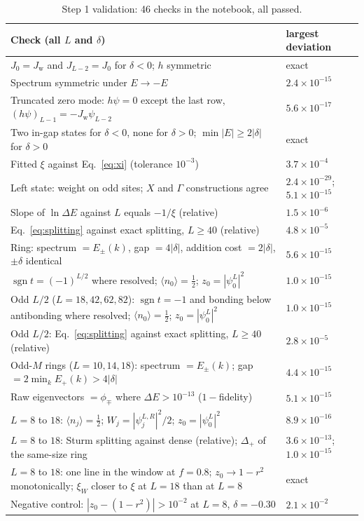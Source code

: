 \documentclass[11pt,a4paper]{article}
\newcommand{\Jw}{J_{\mathrm{w}}}
\begin{document}
\begin{table}[h]
  \centering
  \footnotesize
  \begin{tabular}{p{11.2cm}l}
    \toprule
    Check (all $L$ and $\delta$) & largest deviation \\
    \midrule
    $J_0 = \Jw$ and $J_{L-2} = J_0$ for $\delta<0$; $h$ symmetric & exact \\
    Spectrum symmetric under $E\to-E$ & $2.4\times10^{-15}$ \\
    Truncated zero mode: $h\psi = 0$ except the last row, $(h\psi)_{L-1} = -\Jw\psi_{L-2}$ & $5.6\times10^{-17}$ \\
    Two in-gap states for $\delta<0$, none for $\delta>0$; $\min|E|\ge2|\delta|$ for $\delta>0$ & exact \\
    Fitted $\xi$ against Eq.~\eqref{eq:xi} (tolerance $10^{-3}$) & $3.7\times10^{-4}$ \\
    Left state: weight on odd sites; $X$ and $\Gamma$ constructions agree & $2.4\times10^{-29}$; $5.1\times10^{-15}$ \\
    Slope of $\ln\Delta E$ against $L$ equals $-1/\xi$ (relative) & $1.5\times10^{-6}$ \\
    Eq.~\eqref{eq:splitting} against exact splitting, $L\ge40$ (relative) & $4.8\times10^{-5}$ \\
    Ring: spectrum $=E_\pm(k)$, gap $=4|\delta|$, addition cost $=2|\delta|$, $\pm\delta$ identical & $5.6\times10^{-15}$ \\
    $\operatorname{sgn}t = (-1)^{L/2}$ where resolved; $\langle n_0\rangle = \tfrac12$; $z_0 = |\psi^L_0|^2$ & $1.0\times10^{-15}$ \\
    Odd $L/2$ ($L=18,42,62,82$): $\operatorname{sgn}t = -1$ and bonding below antibonding where resolved; $\langle n_0\rangle = \tfrac12$; $z_0 = |\psi^L_0|^2$ & $1.0\times10^{-15}$ \\
    Odd $L/2$: Eq.~\eqref{eq:splitting} against exact splitting, $L\ge40$ (relative) & $2.8\times10^{-5}$ \\
    Odd-$M$ rings ($L=10,14,18$): spectrum $=E_\pm(k)$; gap $=2\min_k E_+(k) > 4|\delta|$ & $4.4\times10^{-15}$ \\
    Raw eigenvectors $=\phi_\mp$ where $\Delta E>10^{-13}$ ($1-$fidelity) & $5.1\times10^{-15}$ \\
    $L=8$ to $18$: $\langle n_j\rangle=\tfrac12$; $W_j=|\psi^{L,R}_j|^2/2$; $z_0=|\psi^L_0|^2$ & $8.9\times10^{-16}$ \\
    $L=8$ to $18$: Sturm splitting against dense (relative); $\Delta_+$ of the same-size ring & $3.6\times10^{-13}$; $1.0\times10^{-15}$ \\
    $L=8$ to $18$: one line in the window at $f=0.8$; $z_0\to1-r^2$ monotonically; $\xi_W$ closer to $\xi$ at $L=18$ than at $L=8$ & exact \\
    Negative control: $|z_0-(1-r^2)|>10^{-2}$ at $L=8$, $\delta=-0.30$ & $2.1\times10^{-2}$ \\
    \bottomrule
  \end{tabular}
  \caption{Step 1 validation: 46 checks in the notebook, all passed.}
  \label{tab:checks1}
\end{table}
\end{document}

